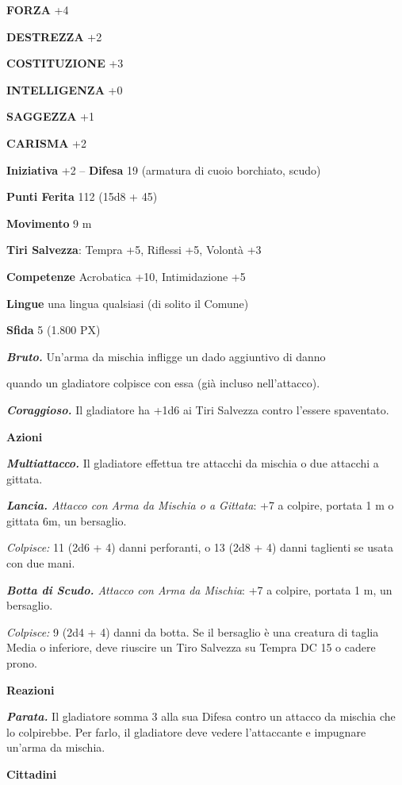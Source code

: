 \begin{multicols}{2}
	\textbf{FORZA} +4

	\textbf{DESTREZZA} +2

	\textbf{COSTITUZIONE} +3

	\textbf{INTELLIGENZA} +0

	\textbf{SAGGEZZA} +1

	\textbf{CARISMA} +2

	\textbf{Iniziativa} +2 -- \textbf{Difesa} 19 (armatura di cuoio borchiato, scudo)

	\textbf{Punti Ferita} 112 (15d8 + 45)

	\textbf{Movimento} 9 m

	\textbf{Tiri Salvezza}: Tempra +5, Riflessi +5, Volontà +3

	\textbf{Competenze} Acrobatica +10, Intimidazione +5

	\textbf{Lingue} una lingua qualsiasi (di solito il Comune)

	\textbf{Sfida} 5 (1.800 PX)

	\textit{\textbf{Bruto.}} Un'arma da mischia infligge un dado aggiuntivo di danno

	quando un gladiatore colpisce con essa (già incluso nell'attacco).

	\textit{\textbf{Coraggioso.}} Il gladiatore ha +1d6 ai Tiri Salvezza contro l'essere spaventato.

	\textbf{Azioni}

	\textit{\textbf{Multiattacco.}} Il gladiatore effettua tre attacchi da mischia o due attacchi a gittata.

	\textit{\textbf{Lancia.} Attacco con Arma da Mischia o a Gittata}: +7 a colpire, portata 1 m o gittata 6m, un bersaglio.

	\textit{Colpisce:} 11 (2d6 + 4) danni perforanti, o 13 (2d8 + 4) danni taglienti se usata con due mani.

	\textit{\textbf{Botta di Scudo.} Attacco con Arma da Mischia}: +7 a colpire, portata 1 m, un bersaglio.

	\textit{Colpisce:} 9 (2d4 + 4) danni da botta. Se il bersaglio è una creatura di taglia Media o inferiore, deve riuscire un Tiro Salvezza su Tempra DC 15 o cadere prono.

	\textbf{Reazioni}

	\textit{\textbf{Parata.}} Il gladiatore somma 3 alla sua Difesa contro un attacco da mischia che lo colpirebbe. Per farlo, il gladiatore deve vedere l'attaccante e impugnare un'arma da mischia.

	\medskip\textbf{Cittadini}


\end{multicols}
